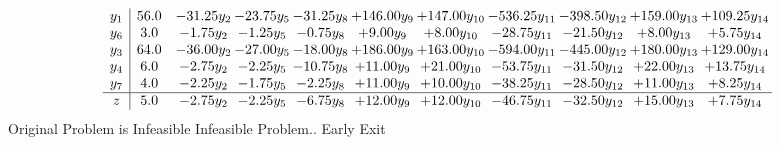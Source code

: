 \documentclass[9pt]{article}
\begin{document}
\[\begin{array}{c| c c@{\hskip 2pt} c@{\hskip 2pt} c@{\hskip 2pt} c@{\hskip 2pt} c@{\hskip 2pt} c@{\hskip 2pt} c@{\hskip 2pt} c@{\hskip 2pt} c@{\hskip 2pt} }
 y_{1}   &  56.0 & -31.25 y_{2} & -23.75 y_{5} & -31.25 y_{8} & + 146.00 y_{9} & + 147.00 y_{10} & -536.25 y_{11} & -398.50 y_{12} & + 159.00 y_{13} & + 109.25 y_{14}\\
 y_{6}   &  3.0 & -1.75 y_{2} & -1.25 y_{5} & -0.75 y_{8} & +  9.00 y_{9} & +  8.00 y_{10} & -28.75 y_{11} & -21.50 y_{12} & +  8.00 y_{13} & +  5.75 y_{14}\\
 y_{3}   &  64.0 & -36.00 y_{2} & -27.00 y_{5} & -18.00 y_{8} & + 186.00 y_{9} & + 163.00 y_{10} & -594.00 y_{11} & -445.00 y_{12} & + 180.00 y_{13} & + 129.00 y_{14}\\
 y_{4}   &  6.0 & -2.75 y_{2} & -2.25 y_{5} & -10.75 y_{8} & + 11.00 y_{9} & + 21.00 y_{10} & -53.75 y_{11} & -31.50 y_{12} & + 22.00 y_{13} & + 13.75 y_{14}\\
 y_{7}   &  4.0 & -2.25 y_{2} & -1.75 y_{5} & -2.25 y_{8} & + 11.00 y_{9} & + 10.00 y_{10} & -38.25 y_{11} & -28.50 y_{12} & + 11.00 y_{13} & +  8.25 y_{14}\\
\hline
z    &  5.0 & -2.75 y_{2} & -2.25 y_{5} & -6.75 y_{8} & + 12.00 y_{9} & + 12.00 y_{10} & -46.75 y_{11} & -32.50 y_{12} & + 15.00 y_{13} & +  7.75 y_{14}\\
\end{array}\]
Original Problem is Infeasible
Infeasible Problem.. Early Exit
\end{document}
